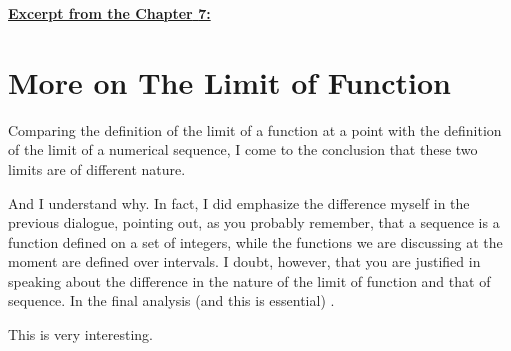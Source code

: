 \underline{\textbf{\textcolor{BurntOrange}{Excerpt from the Chapter} \textcolor{Sepia}{7:}}}

\section{More on The Limit of Function}


\begin{s} 
Comparing the definition of the limit of a function at a point with the definition of the limit of a numerical sequence, I come to the conclusion that these two limits are of different nature.
\end{s}


\begin{p}
And I understand why. In fact, I did emphasize the difference myself in the previous dialogue, pointing out, as you probably remember, that a sequence is a function defined on a set of integers, while the functions we are discussing at the moment are defined over intervals. I doubt, however, that you are justified in speaking about the difference in the nature of the limit of function and that of sequence. In the final analysis (and this is essential) .
\end{p}

\begin{s}
This is very interesting.
\end{s}

